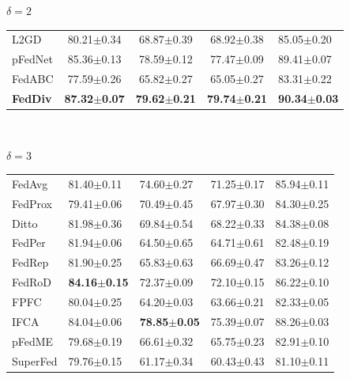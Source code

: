 \documentclass[journal]{IEEEtran}
\begin{document}
\begin{table}
\begin{subtable}[]{$\delta=2$}
\begin{tabular}{@{}lcccl@{}}
			L2GD            & 80.21$\pm$0.34          & 68.87$\pm$0.39          & 68.92$\pm$0.38          & 85.05$\pm$0.20          \\
			pFedNet         & 85.36$\pm$0.13          & 78.59$\pm$0.12          & 77.47$\pm$0.09          & 89.41$\pm$0.07          \\
			FedABC          & 77.59$\pm$0.26          & 65.82$\pm$0.27          & 65.05$\pm$0.27          & 83.31$\pm$0.22          \\
			\textbf{FedDiv} & \textbf{87.32$\pm$0.07} & \textbf{79.62$\pm$0.21} & \textbf{79.74$\pm$0.21} & \textbf{90.34$\pm$0.03} \\ \bottomrule
		\end{tabular}
	\end{subtable}
	\centering
	\\
	\begin{subtable}[]{$\delta=3$}
		\begin{tabular}{@{}lllcl@{}}
			\specialrule{0em}{3pt}{1pt}
			\toprule
			FedAvg          & 81.40$\pm$0.11          & 74.60$\pm$0.27          & 71.25$\pm$0.17          & 85.94$\pm$0.11          \\
			FedProx         & 79.41$\pm$0.06          & 70.49$\pm$0.45          & 67.97$\pm$0.30          & 84.30$\pm$0.25          \\
			Ditto           & 81.98$\pm$0.36          & 69.84$\pm$0.54          & 68.22$\pm$0.33          & 84.38$\pm$0.08          \\
			FedPer          & 81.94$\pm$0.06          & 64.50$\pm$0.65          & 64.71$\pm$0.61          & 82.48$\pm$0.19          \\
			FedRep          & 81.90$\pm$0.25          & 65.83$\pm$0.63          & 66.69$\pm$0.47          & 83.26$\pm$0.12          \\
			FedRoD          & \textbf{84.16$\pm$0.15} & 72.37$\pm$0.09          & 72.10$\pm$0.15          & 86.22$\pm$0.10          \\
			FPFC            & 80.04$\pm$0.25          & 64.20$\pm$0.03          & 63.66$\pm$0.21          & 82.33$\pm$0.05          \\
			IFCA            & 84.04$\pm$0.06          & \textbf{78.85$\pm$0.05} & 75.39$\pm$0.07          & 88.26$\pm$0.03          \\
			pFedME          & 79.68$\pm$0.19          & 66.61$\pm$0.32          & 65.75$\pm$0.23          & 82.91$\pm$0.10          \\
			SuperFed        & 79.76$\pm$0.15          & 61.17$\pm$0.34          & 60.43$\pm$0.43          & 81.10$\pm$0.11          \\

\end{tabular}
\end{subtable}
\end{table}
\end{document}
